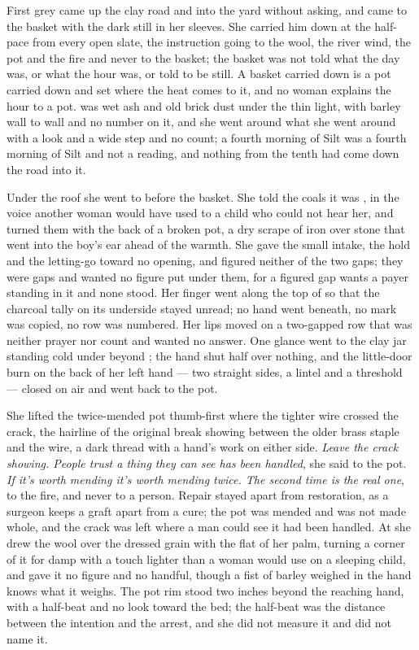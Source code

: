 \scenebreak

First grey came up the clay road and into the yard without asking, and  came to the basket with the dark still in her sleeves. She carried him down  at the half-pace from every open slate, the instruction going to the wool, the river wind, the pot and the fire and never to the basket; the basket was not told what the day was, or what the hour was, or told to be still. A basket carried down is a pot carried down and set where the heat comes to it, and no woman explains the hour to a pot.  was wet ash and old brick dust under the thin light, with barley wall to wall and no number on it, and she went around what she went around with a look and a wide step and no count; a fourth morning of Silt was a fourth morning of Silt and not a reading, and nothing from the tenth had come down the road into it.

Under the roof she went to  before the basket. She told the coals it was , in the voice another woman would have used to a child who could not hear her, and turned them with the back of a broken pot, a dry scrape of iron over stone that went into the boy's ear ahead of the warmth. She gave the small intake, the hold and the letting-go toward no opening, and figured neither of the two gaps; they were gaps and wanted no figure put under them, for a figured gap wants a payer standing in it and none stood. Her finger went along the top of  so that the charcoal tally on its underside stayed unread; no hand went beneath, no mark was copied, no row was numbered. Her lips moved on a two-gapped row that was neither prayer nor count and wanted no answer. One glance went to the clay jar standing cold under  beyond ; the hand shut half over nothing, and the little-door burn on the back of her left hand --- two straight sides, a lintel and a threshold --- closed on air and went back to the pot.

She lifted the twice-mended pot thumb-first where the tighter wire crossed the crack, the hairline of the original break showing between the older brass staple and the wire, a dark thread with a hand's work on either side. \emph{Leave the crack showing. People trust a thing they can see has been handled}, she said to the pot. \emph{If it's worth mending it's worth mending twice. The second time is the real one}, to the fire, and never to a person. Repair stayed apart from restoration, as a surgeon keeps a graft apart from a cure; the pot was mended and was not made whole, and the crack was left where a man could see it had been handled. At  she drew the wool over the dressed grain with the flat of her palm, turning a corner of it for damp with a touch lighter than a woman would use on a sleeping child, and gave it no figure and no handful, though a fist of barley weighed in the hand knows what it weighs. The pot rim stood two inches beyond the reaching hand, with a half-beat and no look toward the bed; the half-beat was the distance between the intention and the arrest, and she did not measure it and did not name it.

